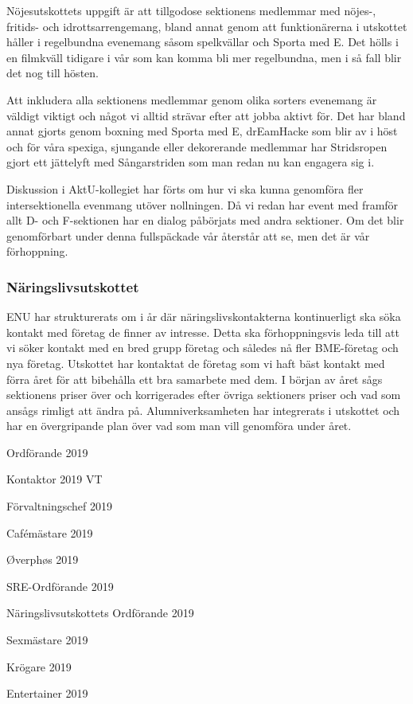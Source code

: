 \documentclass[../_main/handlingar.tex]{subfiles}
\begin{document}
Nöjesutskottets uppgift är att tillgodose sektionens medlemmar med nöjes-, fritids- och idrottsarrengemang, bland annat genom att funktionärerna i utskottet håller i regelbundna evenemang såsom spelkvällar och Sporta med E. Det hölls i en filmkväll tidigare i vår som kan komma bli mer regelbundna, men i så fall blir det nog till hösten. 

Att inkludera alla sektionens medlemmar genom olika sorters evenemang är väldigt viktigt och något vi alltid strävar efter att jobba aktivt för. Det har bland annat gjorts genom boxning med Sporta med E, drEamHacke som blir av i höst och för våra spexiga, sjungande eller dekorerande medlemmar har Stridsropen gjort ett jättelyft med Sångarstriden som man redan nu kan engagera sig i. 

Diskussion i AktU-kollegiet har förts om hur vi ska kunna genomföra fler intersektionella evenmang utöver nollningen. Då vi redan har event med framför allt D- och F-sektionen har en dialog påbörjats med andra sektioner. Om det blir genomförbart under denna fullspäckade vår återstår att se, men det är vår förhoppning. 

\subsubsection*{Näringslivsutskottet}

ENU har strukturerats om i år där näringslivskontakterna kontinuerligt ska söka kontakt med företag de finner av intresse. Detta ska förhoppningsvis leda till att vi söker kontakt med en bred grupp företag och således nå fler BME-företag och nya företag. Utskottet har kontaktat de företag som vi haft bäst kontakt med förra året för att bibehålla ett bra samarbete med dem. I början av året sågs sektionens priser över och korrigerades efter övriga sektioners priser och vad som ansågs rimligt att ändra på. Alumniverksamheten har integrerats i utskottet och har en övergripande plan över vad som man vill genomföra under året.


\newpage
\begin{signatures}{10}
    \mvh
    \signature{\ordf}{Ordförande 2019}
    \signature{Sonja Kenari}{Kontaktor 2019 VT}
    \signature{\fvc}{Förvaltningschef 2019}
    \signature{\cafem}{Cafémästare 2019}
    \signature{\oph}{Øverphøs 2019}
    \signature{\sreordf}{SRE-Ordförande 2019}
    \signature{\enuordf}{Näringslivsutskottets Ordförande 2019}
    \signature{\sexm}{Sexmästare 2019}
    \signature{\krog}{Krögare 2019}
    \signature{\ent}{Entertainer 2019}
\end{signatures}
\end{document}

